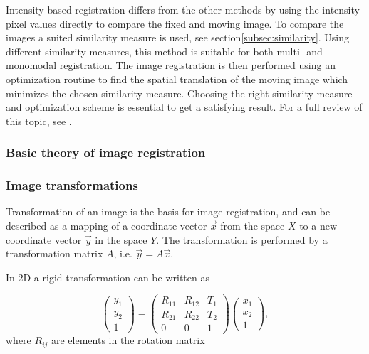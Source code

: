 Intensity based registration differs from the other methods by using the intensity pixel values directly to compare the fixed and moving image. To compare the images a suited similarity measure is used, see section\ref{subsec:similarity}. Using different similarity measures, this method is suitable for both multi- and monomodal registration. The image registration is then performed using an optimization routine to find the spatial translation of the moving image which minimizes the chosen similarity measure. Choosing the right similarity measure and optimization scheme is essential to get a satisfying result. For a full review of this topic, see \cite{Maintz1998}.

\subsubsection{Basic theory of image registration}
\cite{Mainstream}


\subsubsection{Image transformations}

Transformation of an image is the basis for image registration, and can be described as a mapping of a coordinate vector $\vec{x}$ from the space $X$ to a new coordinate vector $\vec{y}$ in the space $Y$. The transformation is performed by a transformation matrix $A$, i.e. $\vec{y} = A\vec{x}$.

In 2D a rigid transformation can be written as 

\begin{equation}
	\label{rigid}
	\begin{pmatrix}
		y_1 \\
		y_2 \\
		1 
	\end{pmatrix}
	=
	\begin{pmatrix}
		R_{11} & R_{12} & T_1\\
		R_{21} & R_{22} & T_2\\		
		0 & 0 & 1
	\end{pmatrix}
	\begin{pmatrix}
		x_1\\
		x_2\\
		1
	\end{pmatrix},
\end{equation}
where $R_{ij}$ are elements in the rotation matrix 

